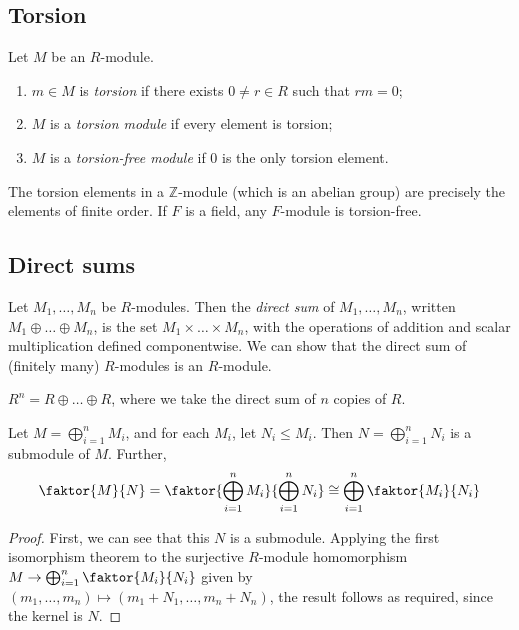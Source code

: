 \subsection{Torsion}
\begin{definition}
	Let $M$ be an $R$-module.
	\begin{enumerate}
		\item $m \in M$ is \textit{torsion} if there exists $0 \neq r \in R$ such that $rm = 0$;
		\item $M$ is a \textit{torsion module} if every element is torsion;
		\item $M$ is a \textit{torsion-free module} if 0 is the only torsion element.
	\end{enumerate}
\end{definition}
\begin{example}
	The torsion elements in a $\mathbb Z$-module (which is an abelian group) are precisely the elements of finite order.
	If $F$ is a field, any $F$-module is torsion-free.
\end{example}

\subsection{Direct sums}
\begin{definition}
	Let $M_1, \dots, M_n$ be $R$-modules.
	Then the \textit{direct sum} of $M_1, \dots, M_n$, written $M_1 \oplus \dots \oplus M_n$, is the set $M_1 \times \dots \times M_n$, with the operations of addition and scalar multiplication defined componentwise.
	We can show that the direct sum of (finitely many) $R$-modules is an $R$-module.
\end{definition}
\begin{example}
	$R^n = R \oplus \dots \oplus R$, where we take the direct sum of $n$ copies of $R$.
\end{example}
\begin{lemma}
	Let $M = \bigoplus_{i=1}^n M_i$, and for each $M_i$, let $N_i \leq M_i$.
	Then $N = \bigoplus_{i=1}^n N_i$ is a submodule of $M$.
	Further,
	\begin{align*}
		\faktor{M}{N} = \faktor{\bigoplus_{i=1}^n M_i}{\bigoplus_{i=1}^n N_i} \cong \bigoplus_{i=1}^n \faktor{M_i}{N_i}
	\end{align*}
\end{lemma}
\begin{proof}
	First, we can see that this $N$ is a submodule.
	Applying the first isomorphism theorem to the surjective $R$-module homomorphism $M \to \bigoplus_{i=1}^n \faktor{M_i}{N_i}$ given by $(m_1, \dots, m_n) \mapsto (m_1 + N_1, \dots, m_n + N_n)$, the result follows as required, since the kernel is $N$.
\end{proof}

